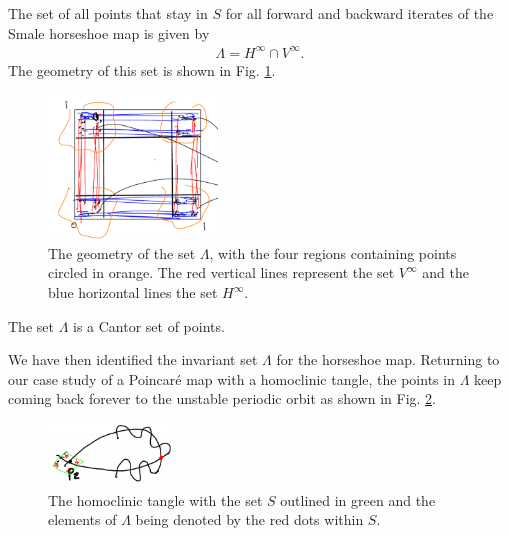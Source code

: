 \begin{definition}
	The set of all points that stay in $S$ for all forward and backward iterates of the Smale horseshoe map  is given by
	 \begin{align}
		\boxed{
\Lambda = H^{\infty } \cap V^{\infty }.
		}
	\end{align}
	The geometry of this set is shown in Fig. \ref{fig:lambda_def}.
	\begin{figure}[h!]
		\centering
		\includegraphics[width=0.4\textwidth]{figures/ch6/19lambda_def.png}
		\caption{The geometry of the set $\Lambda$, with the four regions containing points circled in orange. The red vertical lines represent the set $V^{\infty }$ and the blue horizontal lines the set $H^{\infty }$.}
		\label{fig:lambda_def}
	\end{figure}
\end{definition}

\begin{remark}[]
The set $\Lambda$ is a Cantor set of points.
\end{remark}

We have then identified the invariant set $\Lambda$ for the horseshoe map. Returning to our case study of a Poincaré map with a homoclinic tangle, the points in $\Lambda$ keep coming back forever to the unstable periodic orbit as shown in Fig. \ref{fig:returning_points}. 
\begin{figure}[h!]
	\centering
	\includegraphics[width=0.3\textwidth]{figures/ch6/20returning_points.png}
	\caption{The homoclinic tangle with the set $S$ outlined in green and the elements of $\Lambda$ being denoted by the red dots within $S$.}
	\label{fig:returning_points}
\end{figure}

